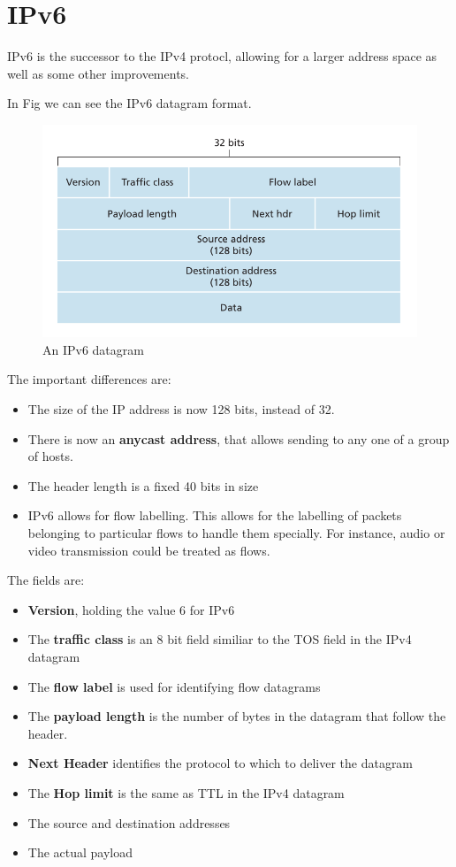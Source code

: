 \documentclass[12pt,letterpaper]{book}
\theoremstyle{definition}
\begin{document}
\section{IPv6}

IPv6 is the successor to the IPv4 protocl, allowing for a larger address space as well as some other improvements.

In Fig we can see the IPv6 datagram format.

\begin{figure}[htpb]
  \centering
  \includegraphics[width=0.8\linewidth]{./assets/ipv6_datagram.png}
  \caption{An IPv6 datagram}%
  \label{fig:}
\end{figure}

The important differences are:

\begin{itemize}
  \item The size of the IP address is now 128 bits, instead of 32.
  \item There is now an \textbf{anycast address}, that allows sending to any one of a group of hosts.
  \item The header length is a fixed 40 bits in size
  \item IPv6 allows for flow labelling. This allows for the labelling of packets belonging to particular flows to handle them specially. For instance, audio or video transmission could be treated as flows.
\end{itemize}

The fields are:
\begin{itemize}
  \item \textbf{Version}, holding the value 6 for IPv6
  \item The \textbf{traffic class} is an 8 bit field similiar to the TOS field in the IPv4 datagram
  \item The \textbf{flow label} is used for identifying flow datagrams
  \item The \textbf{payload length}  is the number of bytes in the datagram that follow the header.
  \item \textbf{Next Header}  identifies the protocol to which to deliver the datagram
  \item The \textbf{Hop limit}  is the same as TTL in the IPv4 datagram
  \item The source and destination addresses
  \item The actual payload
\end{itemize}
\end{document}
